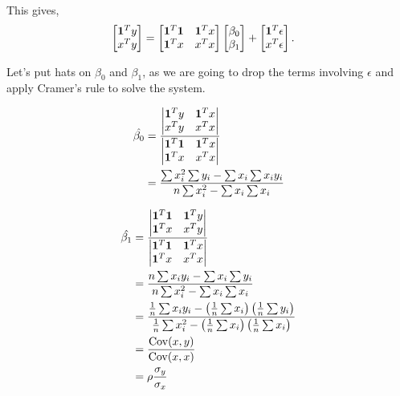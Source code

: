 \documentclass{amsart}
\theoremstyle{plain}
\numberwithin{equation}{section}
\begin{document}
This gives,
\begin{align*}
\begin{bmatrix}
{\bf 1}^Ty\\
x^Ty
\end{bmatrix}
&= 
\begin{bmatrix}
{\bf 1}^T{\bf 1} & {\bf 1}^Tx\\
{\bf 1}^Tx & x^Tx
\end{bmatrix}
\begin{bmatrix}
\beta_0\\
\beta_1
\end{bmatrix} + 
\begin{bmatrix}
{\bf 1}^T \epsilon\\
x^T\epsilon
\end{bmatrix}.
\end{align*}

Let's put hats on $\beta_0$ and 
$\beta_1$, as we are going to drop the 
terms involving $\epsilon$ and apply 
Cramer's rule to solve the system.

\begin{align*}
\hat{\beta_0} &= \frac{
\left|
\begin{matrix}
{\bf 1}^Ty & {\bf 1}^Tx\\
x^Ty & x^Tx
\end{matrix}
\right|}
{
\left|
\begin{matrix}
{\bf 1}^T{\bf 1} & {\bf 1}^Tx\\
{\bf 1}^Tx & x^Tx
\end{matrix}
\right|}\\
&=\frac{\sum{x_i^2}\sum{y_i}-\sum{x_i}\sum{x_i y_i}}{n\sum{x_i^2}-\sum{x_i}\sum{x_i}}
\end{align*}

\begin{align*}
\hat{\beta_1} &= \frac{
\left|
\begin{matrix}
{\bf 1}^T{\bf 1} & {\bf 1}^Ty\\
{\bf 1}^Tx & x^Ty
\end{matrix}
\right|}
{
\left|
\begin{matrix}
{\bf 1}^T{\bf 1} & {\bf 1}^Tx\\
{\bf 1}^Tx & x^Tx
\end{matrix}
\right|}\\ 
& = \frac{n \sum{x_i y_i} - \sum{x_i}\sum{y_i}}
{n\sum{x_i^2}-\sum{x_i}\sum{x_i}}\\
& = \frac{ \frac{1}{n}\sum{x_i y_i} - 
\left(\frac{1}{n}\sum{x_i}\right)\left(\frac{1}{n}\sum{y_i}\right)}
{\frac{1}{n}\sum{x_i^2}-
\left(\frac{1}{n}\sum{x_i}\right)\left(\frac{1}{n}\sum{x_i}\right)}\\
& = \frac{\mathrm{Cov}(x, y)}{\mathrm{Cov}(x, x)}\\
& = \rho \frac{\sigma_y}{\sigma_x}
\end{align*}
\end{document}
